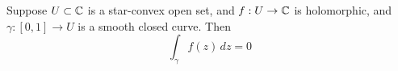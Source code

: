 \documentclass{homework}
\begin{document}
                                                                                                                                                                                                                                                                                                                                        \begin{problem}\label{cauchy-for-starlike}Suppose $U \subset \mathbb{C}$ is a
                                                                                                                                                                                                                                                                                                                                          star-convex open set, and $f : U \to \mathbb{C}$ is holomorphic, and
                                                                                                                                                                                                                                                                                                                                            $\gamma : [0,1] \to U$ is a smooth closed curve.  Then
                                                                                                                                                                                                                                                                                                                                              \[
                                                                                                                                                                                                                                                                                                                                                  \int_\gamma f(z) \, dz = 0
                                                                                                                                                                                                                                                                                                                                                    \]
                                                                                                                                                                                                                                                                                                                                                    \end{problem}
\end{document}
